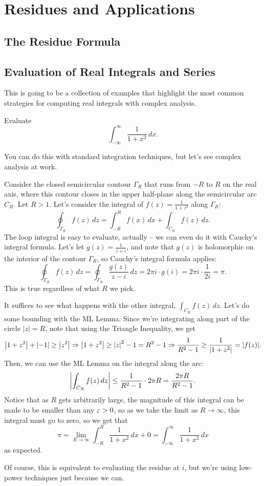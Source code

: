\section{Residues and Applications}

\subsection{The Residue Formula}

\subsection{Evaluation of Real Integrals and Series}
This is going to be a collection of examples that highlight the most common strategies for computing real integrals with complex analysis.

\begin{example}
  Evaluate \[\int_{-\infty}^{\infty} \frac 1{1 + x^2} \, dx.\]
\end{example}
You can do this with standard integration techniques, but let's see complex analysis at work.
\begin{solution}
  Consider the closed semicircular contour $\Gamma_R$ that runs from $-R$ to $R$ on the real axis, where this contour  closes in the upper half-plane along the semicircular arc $C_R$. Let $R > 1$. Let's consider the integral of $f(z) = \frac 1{1+z^2}$ along $\Gamma_R$:
  \[ \oint_{\Gamma_R} f(z) \, dz = \int_{-R}^R f(x) \, dx + \int_{C_R} f(z) \, dz.\]
  The loop integral is easy to evaluate, actually -- we can even do it with Cauchy's integral formula. Let's let $g(z) = \frac 1{z+i}$, and note that $g(z)$ is holomorphic on the interior of the contour $\Gamma_R$, so Cauchy's integral formula applies:
  \[\oint_{\Gamma_R} f(z) \, dz = \oint_{\Gamma_R} \frac{g(z)}{z-i} \, dz = 2\pi i \cdot g(i) = 2\pi i \cdot \frac 1{2i} = \pi.\]
  This is true regardless of what $R$ we pick.

  It suffices to see what happens with the other integral, $\int_{C_R} f(z) \, dz$. Let's do some bounding with the ML Lemma. Since we're integrating along part of the circle $|z| = R$, note that using the Triangle Inequality, we get
  \[ \left\lvert 1 + z^2 \right\rvert + \left\lvert -1 \right\rvert \geq \left\lvert z^2 \right\rvert \Rightarrow \left\lvert 1+z^2 \right\rvert \geq \left\lvert z \right\rvert^2 - 1 = R^2 - 1 \Rightarrow \frac 1{R^2 - 1} \geq \frac 1{\left\lvert 1+z^2 \right\rvert} = |f(z)|.\]
  Then, we can use the ML Lemma on the integral along the arc:
  \[ \left\lvert \int_{C_R} f(z) \, dz \right\rvert \leq \frac 1{R^2 - 1} \cdot 2\pi R = \frac{2\pi R}{R^2 - 1}.\]
  Notice that as $R$ gets arbitrarily large, the magnitude of this integral can be made to be smaller than any $\varepsilon > 0$, so as we take the limit as $R \to \infty$, this integral must go to zero, so we get that
  \[\pi = \lim_{R \to \infty} \int_{-R}^R \frac 1{1 + x^2} \, dx + 0 = \int_{-\infty}^\infty \frac 1{1+x^2} \, dx\]
  as expected.
\end{solution}
Of course, this is equivalent to evaluating the residue at $i$, but we're using low-power techniques just because we can.

